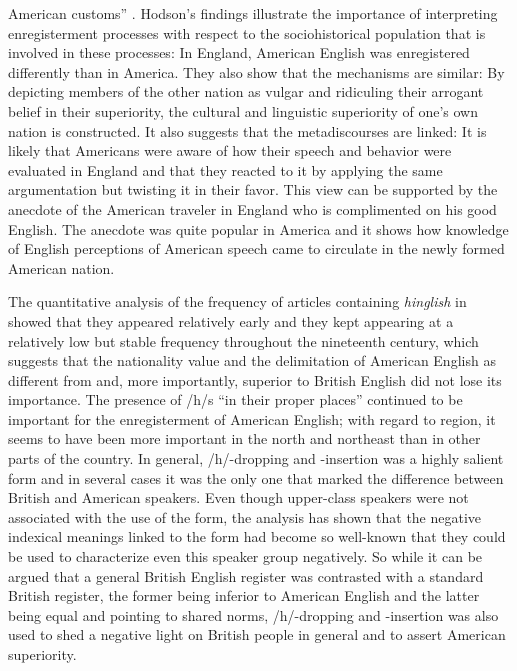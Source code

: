 American customs” \citep[38]{Hodson2017}. Hodson's findings illustrate the importance of interpreting enregisterment processes with respect to the sociohistorical population that is involved in these processes: In England, American English was enregistered differently than in America. They also show that the mechanisms are similar: By depicting members of the other nation as vulgar and ridiculing their arrogant belief in their superiority, the cultural and linguistic superiority of one’s own nation is constructed. It also suggests that the metadiscourses are linked: It is likely that Americans were aware of how their speech and behavior were evaluated in England and that they reacted to it by applying the same argumentation but twisting it in their favor. This view can be supported by the anecdote of the American traveler in England who is complimented on his good English. The anecdote was quite popular in America and it shows how knowledge of English perceptions of American speech came to circulate in the newly formed American nation.

The quantitative analysis of the frequency of articles containing \emph{hinglish} in  showed that they appeared relatively early and they kept appearing at a relatively low but stable frequency throughout the nineteenth century, which suggests that the nationality value and the delimitation of American English as different from and, more importantly, superior to British English did not lose its importance. The presence of /h/s “in their proper places” continued to be important for the enregisterment of American English; with regard to region, it seems to have been more important in the north and northeast than in other parts of the country. In general, /h/-dropping and \--insertion was a highly salient form and in several cases it was the only one that marked the difference between British and American speakers. Even though upper-class speakers were not associated with the use of the form, the analysis has shown that the negative indexical meanings linked to the form had become so well-known that they could be used to characterize even this speaker group negatively. So while it can be argued that a general British English register was contrasted with a standard British register, the former being inferior to American English and the latter being equal and pointing to shared norms, /h/-dropping and -insertion was also used to shed a negative light on British people in general and to assert American superiority.

